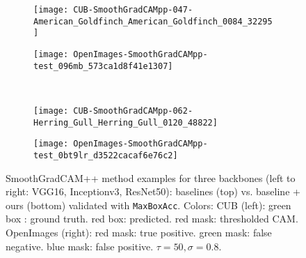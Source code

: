 \documentclass[twocolumn]{article}
\newcommand\maxboxacc{\texttt{MaxBoxAcc}\xspace}
\theoremstyle{definition}
\begin{document}
\begin{figure*}
     \begin{subfigure}[b]{0.49\textwidth}
         \centering
         \texttt{[image: CUB-SmoothGradCAMpp-047-American\_Goldfinch\_American\_Goldfinch\_0084\_32295]}
       \end{subfigure}
     \hfill
     \begin{subfigure}[b]{0.49\textwidth}
         \centering
         \texttt{[image: OpenImages-SmoothGradCAMpp-test\_096mb\_573ca1d8f41e1307]}
     \end{subfigure}
     \\
     \vspace{0.1cm}
     \begin{subfigure}[b]{0.49\textwidth}
         \centering
         \texttt{[image: CUB-SmoothGradCAMpp-062-Herring\_Gull\_Herring\_Gull\_0120\_48822]}
     \end{subfigure}
     \hfill
     \begin{subfigure}[b]{0.49\textwidth}
         \centering
         \texttt{[image: OpenImages-SmoothGradCAMpp-test\_0bt9lr\_d3522cacaf6e76c2]}
     \end{subfigure}
        \caption{SmoothGradCAM++ method examples for three backbones (left to right: VGG16, Inceptionv3, ResNet50): baselines (top) vs. baseline + ours (bottom)  validated with \maxboxacc. Colors: CUB (left): green box : ground truth. red box: predicted. red mask: thresholded CAM. OpenImages (right): red mask: true positive. green mask: false negative. blue mask: false positive. ${\tau=50, \sigma=0.8}$.}
        \label{fig:smoothgradcampp-cub-openim-example-pred}
\end{figure*}
\end{document}
